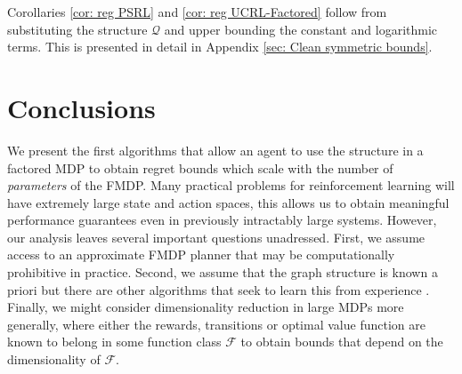 \documentclass{article}
\newcommand{\Qc}{\mathcal{Q}}
\newcommand{\Fc}{\mathcal{F}}
\begin{document}
Corollaries \ref{cor: reg PSRL} and \ref{cor: reg UCRL-Factored} follow from substituting the structure $\Qc$ and upper bounding the constant and logarithmic terms.
This is presented in detail in Appendix \ref{sec: Clean symmetric bounds}.

\section{Conclusions}
We present the first algorithms that allow an agent to use the structure in a factored MDP to obtain regret bounds which scale with the number of \emph{parameters} of the FMDP.
Many practical problems for reinforcement learning will have extremely large state and action spaces, this allows us to obtain meaningful performance guarantees even in previously intractably large systems.
However, our analysis leaves several important questions unadressed.
First, we assume access to an approximate FMDP planner that may be computationally prohibitive in practice.
Second, we assume that the graph structure is known a priori but there are other algorithms that seek to learn this from experience \cite{strehl2007efficient}.
Finally, we might consider dimensionality reduction in large MDPs more generally, where either the rewards, transitions or optimal value function are known to belong in some function class $\Fc$ to obtain bounds that depend on the dimensionality of $\Fc$.

\end{document}
